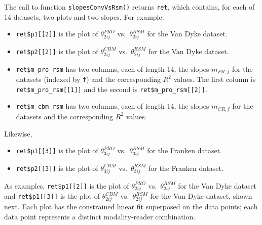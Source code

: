 \documentclass[
]{book}
\providecommand{\tightlist}{%
  \setlength{\itemsep}{0pt}\setlength{\parskip}{0pt}}
\begin{document}
The call to function \texttt{slopesConvVsRsm()} returns \texttt{ret}, which contains, for each of 14 datasets, two plots and two slopes. For example:

\begin{itemize}
\tightlist
\item
  \texttt{ret\$p1{[}{[}2{]}{]}} is the plot of \(\theta^{PRO}_{2ij}\) vs.~\(\theta^{RSM}_{2ij}\) for the Van Dyke dataset.
\item
  \texttt{ret\$p2{[}{[}2{]}{]}} is the plot of \(\theta^{CBM}_{2ij}\) vs.~\(\theta^{RSM}_{2ij}\) for the Van Dyke dataset.
\item
  \texttt{ret\$m\_pro\_rsm} has two columns, each of length 14, the slopes \(m_{PR,f}\) for the datasets (indexed by \texttt{f}) and the corresponding \(R^2\) values. The first column is \texttt{ret\$m\_pro\_rsm{[}{[}1{]}{]}} and the second is \texttt{ret\$m\_pro\_rsm{[}{[}2{]}{]}}.
\item
  \texttt{ret\$m\_cbm\_rsm} has two columns, each of length 14, the slopes \(m_{CR,f}\) for the datasets and the corresponding \(R^2\) values.
\end{itemize}

Likewise,

\begin{itemize}
\tightlist
\item
  \texttt{ret\$p1{[}{[}3{]}{]}} is the plot of \(\theta^{PRO}_{3ij}\) vs.~\(\theta^{RSM}_{3ij}\) for the Franken dataset.
\item
  \texttt{ret\$p2{[}{[}3{]}{]}} is the plot of \(\theta^{CBM}_{3ij}\) vs.~\(\theta^{RSM}_{3ij}\) for the Franken dataset.
\end{itemize}

As examples, \texttt{ret\$p1{[}{[}2{]}{]}} is the plot of \(\theta^{PRO}_{2ij}\) vs.~\(\theta^{RSM}_{2ij}\) for the Van Dyke dataset and \texttt{ret\$p1{[}{[}3{]}{]}} is the plot of \(\theta^{CBM}_{2ij}\) vs.~\(\theta^{RSM}_{2ij}\) for the Van Dyke dataset, shown next. Each plot has the constrained linear fit superposed on the data points; each data point represents a distinct modality-reader combination.
\end{document}
